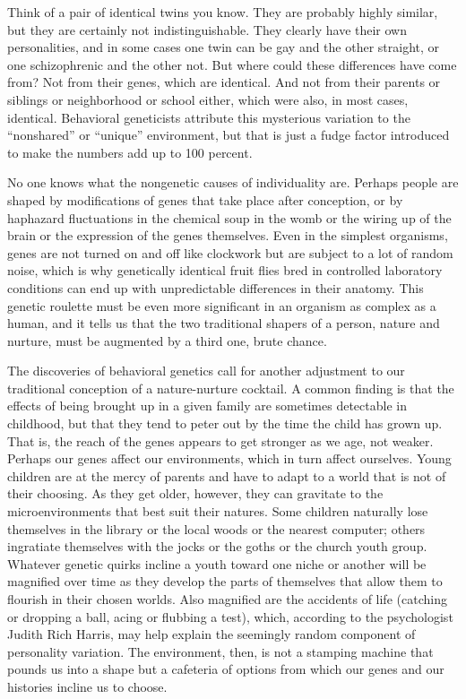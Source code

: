 Think of a pair of identical twins you know. They are probably highly
similar, but they are certainly not indistinguishable. They clearly have
their own personalities, and in some cases one twin can be gay and the
other straight, or one schizophrenic and the other not. But where could
these differences have come from? Not from their genes, which are
identical. And not from their parents or siblings or neighborhood or
school either, which were also, in most cases, identical. Behavioral
geneticists attribute this mysterious variation to the ``nonshared'' or
``unique'' environment, but that is just a fudge factor introduced to
make the numbers add up to 100 percent.

No one knows what the nongenetic causes of individuality are. Perhaps
people are shaped by modifications of genes that take place after
conception, or by haphazard fluctuations in the chemical soup in the
womb or the wiring up of the brain or the expression of the genes
themselves. Even in the simplest organisms, genes are not turned on and
off like clockwork but are subject to a lot of random noise, which is
why genetically identical fruit flies bred in controlled laboratory
conditions can end up with unpredictable differences in their anatomy.
This genetic roulette must be even more significant in an organism as
complex as a human, and it tells us that the two traditional shapers of
a person, nature and nurture, must be augmented by a third one, brute
chance.

The discoveries of behavioral genetics call for another adjustment to
our traditional conception of a nature-nurture cocktail. A common
finding is that the effects of being brought up in a given family are
sometimes detectable in childhood, but that they tend to peter out by
the time the child has grown up. That is, the reach of the genes appears
to get stronger as we age, not weaker. Perhaps our genes affect our
environments, which in turn affect ourselves. Young children are at the
mercy of parents and have to adapt to a world that is not of their
choosing. As they get older, however, they can gravitate to the
microenvironments that best suit their natures. Some children naturally
lose themselves in the library or the local woods or the nearest
computer; others ingratiate themselves with the jocks or the goths or
the church youth group. Whatever genetic quirks incline a youth toward
one niche or another will be magnified over time as they develop the
parts of themselves that allow them to flourish in their chosen worlds.
Also magnified are the accidents of life (catching or dropping a ball,
acing or flubbing a test), which, according to the psychologist Judith
Rich Harris, may help explain the seemingly random component of
personality variation. The environment, then, is not a stamping machine
that pounds us into a shape but a cafeteria of options from which our
genes and our histories incline us to choose.

